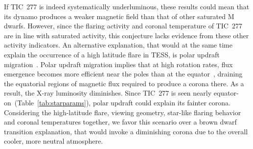 \documentclass[twocolumn]{aastex631}
\begin{document}

If TIC~277 is indeed systematically underluminous, these results could mean that its dynamo produces a weaker magnetic field than that of other saturated M dwarfs. However, since the flaring activity and coronal temperature of TIC~277 are in line with saturated activity, this conjecture lacks evidence from these other activity indicators. An alternative explanation, that would at the same time explain the occurrence of a high latitude flare in TESS, is polar updraft migration~\citep{stepien2001rosat}. Polar updraft migration implies that at high rotation rates, flux emergence becomes more efficient near the poles than at the equator~\citep{weber2016modeling}, draining the equatorial regions of magnetic flux required to produce a corona there. As a result, the X-ray luminosity diminishes. Since TIC~277 is seen nearly equator-on~(Table~\ref{tab:starparams}), polar updraft could explain its fainter corona. Considering the high-latitude flare, viewing geometry, star-like flaring behavior and coronal temperatures together, we favor this scenario over a brown dwarf transition explanation, that would invoke a diminishing corona due to the overall cooler, more neutral atmosphere. 








 

\end{document}
